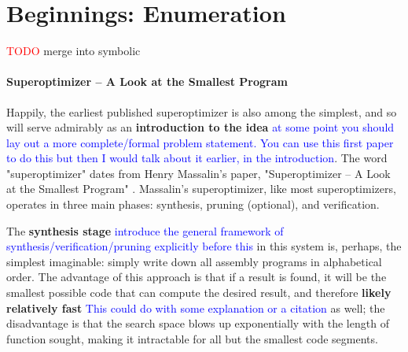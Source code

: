 \documentclass[12pt,twoside]{reedthesis}
\newcommand{\red}[1]{\textcolor{red}{#1}}
\newcommand{\comment}[2]{\textbf{#1} \textcolor{blue}{#2}}
\begin{document}

\chapter{Beginnings: Enumeration}
\red{TODO} merge into symbolic

\subsubsection{Superoptimizer -- A Look at the Smallest Program}
Happily, the earliest published superoptimizer is also among the simplest, and so will serve admirably as an \comment{introduction to the idea}{at some point you should lay out a more complete/formal problem statement. You can use this first paper to do this but then I would talk about it earlier, in the introduction}. 
The word "superoptimizer" dates from Henry Massalin's paper, "Superoptimizer -- A Look at the Smallest Program" \cite{massalin1987superoptimizer}.
Massalin's superoptimizer, like most superoptimizers, operates in three main phases: synthesis, pruning (optional), and verification.

The \comment{synthesis stage}{introduce the general framework of synthesis/verification/pruning explicitly before this} in this system is, perhaps, the simplest imaginable: simply write down all assembly programs in alphabetical order.
The advantage of this approach is that if a result is found, it will be the smallest possible code that can compute the desired result, and therefore \comment{likely relatively fast}{This could do with some explanation or a citation} as well;
the disadvantage is that the search space blows up exponentially with the length of function sought, making it intractable for all but the smallest code segments.
\end{document}
